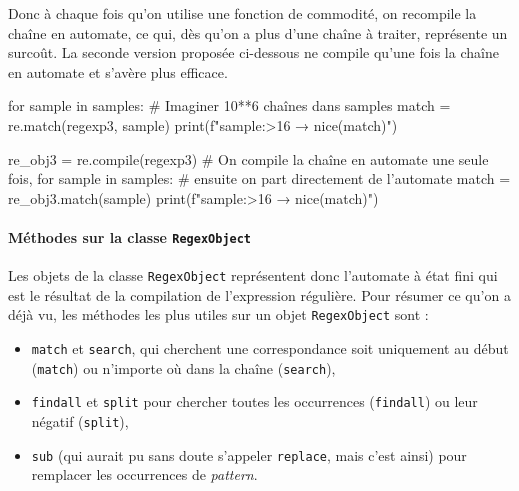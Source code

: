 Donc à chaque fois qu'on utilise une fonction de commodité, on recompile la chaîne en automate, ce qui, dès qu'on a plus d'une chaîne à traiter, représente un surcoût. La seconde version proposée ci-dessous ne compile qu'une fois la chaîne en automate et s'avère plus efficace.

\begin{idleconsole*}
	\begin{pyconsole}
for sample in samples: # Imaginer 10**6 chaînes dans samples
    match = re.match(regexp3, sample)
    print(f"{sample:>16} → {nice(match)}")

re_obj3 = re.compile(regexp3) # On compile la chaîne en automate une seule fois,
for sample in samples:        # ensuite on part directement de l'automate
    match = re_obj3.match(sample)
    print(f"{sample:>16} → {nice(match)}")

\end{pyconsole}
\end{idleconsole*}

\vspace{1pt}

\paragraph{Méthodes sur la classe {\normalfont\texttt{RegexObject}}}
Les objets de la classe \texttt{RegexObject} représentent donc l'automate à état fini qui est le résultat de la compilation de l'expression régulière. Pour résumer ce qu'on a déjà vu, les méthodes les plus utiles sur un objet \texttt{RegexObject} sont :
\begin{itemize}
\item \texttt{match} et \texttt{search}, qui cherchent une correspondance soit uniquement au début (\texttt{match}) ou n'importe où dans la chaîne (\texttt{search}),
\item \texttt{findall} et \texttt{split} pour chercher toutes les occurrences (\texttt{findall}) ou leur négatif (\texttt{split}),
\item \texttt{sub} (qui aurait pu sans doute s'appeler \texttt{replace}, mais c'est ainsi) pour remplacer les occurrences de \textit{pattern}.
\end{itemize}

